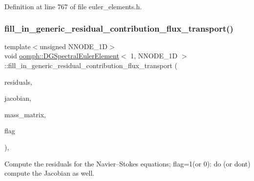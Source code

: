 Definition at line 767 of file euler\+\_\+elements.\+h.

\mbox{\label{classoomph_1_1DGSpectralEulerElement_3_011_00_01NNODE__1D_01_4_ae0ae9526ab9aae474a1e834f32dc2580}} 
\subsubsection{\texorpdfstring{fill\+\_\+in\+\_\+generic\+\_\+residual\+\_\+contribution\+\_\+flux\+\_\+transport()}{fill\_in\_generic\_residual\_contribution\_flux\_transport()}}
{\footnotesize\ttfamily template$<$unsigned N\+N\+O\+D\+E\+\_\+1D$>$ \\
void \hyperlink{classoomph_1_1DGSpectralEulerElement}{oomph\+::\+D\+G\+Spectral\+Euler\+Element}$<$ 1, N\+N\+O\+D\+E\+\_\+1D $>$\+::fill\+\_\+in\+\_\+generic\+\_\+residual\+\_\+contribution\+\_\+flux\+\_\+transport (\begin{DoxyParamCaption}\item[{\hyperlink{classoomph_1_1Vector}{Vector}$<$ double $>$ \&}]{residuals,  }\item[{\hyperlink{classoomph_1_1DenseMatrix}{Dense\+Matrix}$<$ double $>$ \&}]{jacobian,  }\item[{\hyperlink{classoomph_1_1DenseMatrix}{Dense\+Matrix}$<$ double $>$ \&}]{mass\+\_\+matrix,  }\item[{unsigned}]{flag }\end{DoxyParamCaption})\hspace{0.3cm}{\ttfamily [inline]}, {\ttfamily [virtual]}}



Compute the residuals for the Navier--Stokes equations; flag=1(or 0)\+: do (or don\textquotesingle{}t) compute the Jacobian as well. 



